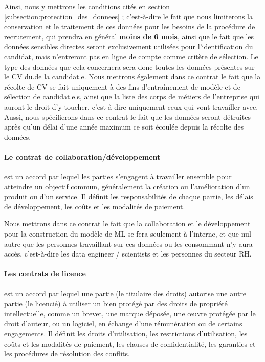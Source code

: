 Ainsi, nous y mettrons les conditions cités en section \ref{subsection:protection_des_donnees} ; c'est-à-dire le fait que nous limiterons la conservation et le traitement de ces données  pour les besoins de la procédure de recrutement, qui prendra en général \textbf{moins de 6 mois}, ainsi que le fait que les données sensibles directes seront exclusivement utilisées pour l'identification du candidat, mais n'entreront pas en ligne de compte comme critère de sélection. Le type des données que cela concernera sera donc toutes les données présentes sur le CV du.de la candidat.e. Nous mettrons également dans ce contrat le fait que la récolte de CV se fait uniquement à des fins d'entraînement de modèle et de sélection de candidat.e.s, ainsi que la liste des corps de métiers de l'entreprise qui auront le droit d'y toucher, c'est-à-dire uniquement ceux qui vont travailler avec. \newline
Aussi, nous spécifierons dans ce contrat le fait que les données seront détruites après qu'un délai d'une année maximum ce soit écoulée depuis la récolte des données.

\paragraph{Le contrat de collaboration/développement} est un accord par lequel les parties s'engagent à travailler ensemble pour atteindre un objectif commun, généralement la création ou l'amélioration d'un produit ou d'un service. Il définit les responsabilités de chaque partie, les délais de développement, les coûts et les modalités de paiement.

Nous mettrons dans ce contrat le fait que la collaboration et le développement pour la construction du modèle de ML se fera seulement à l'interne, et que nul autre que les personnes travaillant sur ces données ou les consommant n'y aura accès, c'est-à-dire les data engineer / scientists et les personnes du secteur RH.\newline

\paragraph{Les contrats de licence} est un accord par lequel une partie (le titulaire des droits) autorise une autre partie (le licencié) à utiliser un bien protégé par des droits de propriété intellectuelle, comme un brevet, une marque déposée, une œuvre protégée par le droit d'auteur, ou un logiciel, en échange d'une rémunération ou de certains engagements. Il définit les droits d'utilisation, les restrictions d'utilisation, les coûts et les modalités de paiement, les clauses de confidentialité, les garanties et les procédures de résolution des conflits.

